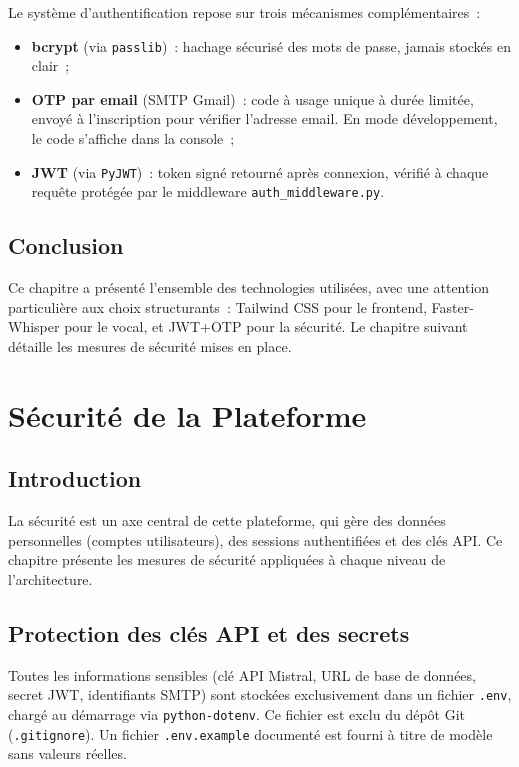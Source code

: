\documentclass[12pt,a4paper]{report}
\begin{document}
Le système d'authentification repose sur trois mécanismes complémentaires~:

\begin{itemize}[label=\textbullet]
    \item \textbf{bcrypt} (via \texttt{passlib})~: hachage sécurisé des mots de passe, jamais stockés en clair~;
    \item \textbf{OTP par email} (SMTP Gmail)~: code à usage unique à durée limitée, envoyé à l'inscription pour vérifier l'adresse email. En mode développement, le code s'affiche dans la console~;
    \item \textbf{JWT} (via \texttt{PyJWT})~: token signé retourné après connexion, vérifié à chaque requête protégée par le middleware \texttt{auth\_middleware.py}.
\end{itemize}

\section{Conclusion}

Ce chapitre a présenté l'ensemble des technologies utilisées, avec une attention particulière aux choix structurants~: Tailwind CSS pour le frontend, Faster-Whisper pour le vocal, et JWT+OTP pour la sécurité. Le chapitre suivant détaille les mesures de sécurité mises en place.

\chapter{Sécurité de la Plateforme}
\label{chap:securite}

\section{Introduction}

La sécurité est un axe central de cette plateforme, qui gère des données personnelles (comptes utilisateurs), des sessions authentifiées et des clés API. Ce chapitre présente les mesures de sécurité appliquées à chaque niveau de l'architecture.

\section{Protection des clés API et des secrets}

Toutes les informations sensibles (clé API Mistral, URL de base de données, secret JWT, identifiants SMTP) sont stockées exclusivement dans un fichier \texttt{.env}, chargé au démarrage via \texttt{python-dotenv}. Ce fichier est exclu du dépôt Git (\texttt{.gitignore}). Un fichier \texttt{.env.example} documenté est fourni à titre de modèle sans valeurs réelles.
\end{document}
